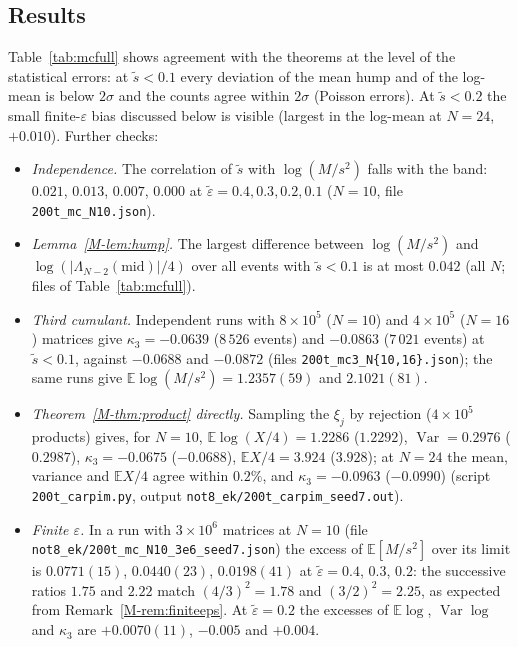 \documentclass[12pt]{amsart}
\theoremstyle{remark}
\newcommand{\E}{\mathbb{E}}
\newcommand{\eps}{\varepsilon}
\newcommand{\1}{\mathbf{1}}
\DeclareMathOperator{\Var}{Var}
\begin{document}
\subsection*{Results}
Table~\ref{tab:mcfull} shows agreement with the theorems at the level of the
statistical errors: at $\tilde s<0.1$ every deviation of the mean hump and
of the log-mean is below $2\sigma$ and the counts agree within $2\sigma$
(Poisson errors). At $\tilde s<0.2$ the small finite-$\eps$ bias
discussed below is visible (largest in the log-mean at $N=24$, $+0.010$).
Further checks:
\begin{itemize}
\item \emph{Independence.} The correlation of $\tilde s$ with
$\log(M/s^2)$ falls with the band: $0.021$, $0.013$, $0.007$, $0.000$ at
$\tilde\eps=0.4,0.3,0.2,0.1$ ($N=10$, file \texttt{200t\_mc\_N10.json}).
\item \emph{Lemma~\ref{M-lem:hump}.} The largest difference between
$\log(M/s^2)$ and $\log(|\Lambda_{N-2}(\mathrm{mid})|/4)$ over all events
with $\tilde s<0.1$ is at most $0.042$ (all $N$; files of
Table~\ref{tab:mcfull}).
\item \emph{Third cumulant.} Independent runs with $8\times10^5$ ($N=10$)
and $4\times10^5$ ($N=16$) matrices give $\kappa_3=-0.0639$ ($8\,526$
events) and $-0.0863$ ($7\,021$ events) at $\tilde s<0.1$, against
$-0.0688$ and $-0.0872$ (files \texttt{200t\_mc3\_N\{10,16\}.json}); the same
runs give $\E\log(M/s^2)=1.2357(59)$ and $2.1021(81)$.
\item \emph{Theorem~\ref{M-thm:product} directly.} Sampling the $\xi_j$ by
rejection ($4\times10^5$ products) gives, for $N=10$, $\E\log(X/4)=1.2286$
($1.2292$), $\Var=0.2976$ ($0.2987$), $\kappa_3=-0.0675$ ($-0.0688$),
$\E X/4=3.924$ ($3.928$); at $N=24$ the mean, variance and $\E X/4$ agree
within $0.2\%$, and $\kappa_3=-0.0963$ ($-0.0990$) (script
\texttt{200t\_carpim.py}, output \nolinkurl{not8_ek/200t_carpim_seed7.out}).
\item \emph{Finite $\eps$.} In a run with $3\times10^6$ matrices at $N=10$
(file \nolinkurl{not8_ek/200t_mc_N10_3e6_seed7.json})
the excess of $\E[M/s^2]$ over its limit is $0.0771(15)$, $0.0440(23)$,
$0.0198(41)$ at $\tilde\eps=0.4$, $0.3$, $0.2$: the successive ratios $1.75$
and $2.22$ match $(4/3)^2=1.78$ and $(3/2)^2=2.25$, as expected from
Remark~\ref{M-rem:finiteeps}. At $\tilde\eps=0.2$ the excesses of
$\E\log$, $\Var\log$ and $\kappa_3$ are $+0.0070(11)$, $-0.005$ and
$+0.004$.
\end{itemize}
\end{document}
